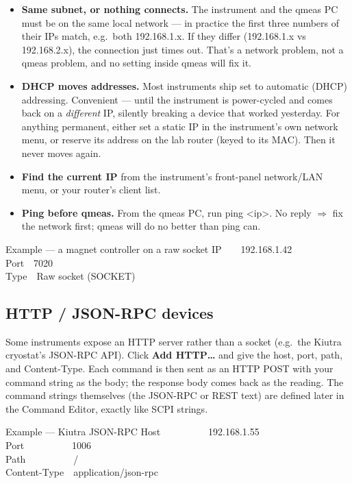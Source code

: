 \documentclass[11pt,a4paper]{article}
\newcommand{\code}[1]{{\ttfamily\color{qcode}#1}}
\begin{document}
\begin{itemize}
  \item \textbf{Same subnet, or nothing connects.} The instrument and the
  qmeas PC must be on the same local network --- in practice the first three
  numbers of their IPs match, e.g.\ both \code{192.168.1.x}. If they differ
  (\code{192.168.1.x} vs \code{192.168.2.x}), the connection just times out.
  That's a network problem, not a qmeas problem, and no setting inside qmeas
  will fix it.
  \item \textbf{DHCP moves addresses.} Most instruments ship set to
  automatic (DHCP) addressing. Convenient --- until the instrument is
  power-cycled and comes back on a \emph{different} IP, silently breaking a
  device that worked yesterday. For anything permanent, either set a static
  IP in the instrument's own network menu, or reserve its address on the lab
  router (keyed to its MAC). Then it never moves again.
  \item \textbf{Find the current IP} from the instrument's front-panel
  network/LAN menu, or your router's client list.
  \item \textbf{Ping before qmeas.} From the qmeas PC, run \code{ping
  <ip>}. No reply $\Rightarrow$ fix the network first; qmeas will do no
  better than ping can.
\end{itemize}

\begin{gridex}{Example --- a magnet controller on a raw socket}
IP\ \ \ \ 192.168.1.42\\
Port\ \ 7020\\
Type\ \ Raw socket (SOCKET)
\end{gridex}

\subsection{HTTP / JSON-RPC devices}

Some instruments expose an HTTP server rather than a socket (e.g.\ the
Kiutra cryostat's JSON-RPC API). Click \textbf{Add HTTP\ldots} and give the
host, port, path, and \code{Content-Type}. Each command is then sent as an
HTTP POST with your command string as the body; the response body comes back
as the reading. The command strings themselves (the JSON-RPC or REST text)
are defined later in the Command Editor, exactly like SCPI strings.

\begin{gridex}{Example --- Kiutra JSON-RPC}
Host\ \ \ \ \ \ \ \ \ \ 192.168.1.55\\
Port\ \ \ \ \ \ \ \ \ \ 1006\\
Path\ \ \ \ \ \ \ \ \ \ /\\
Content-Type\ \ application/json-rpc
\end{gridex}
\end{document}
